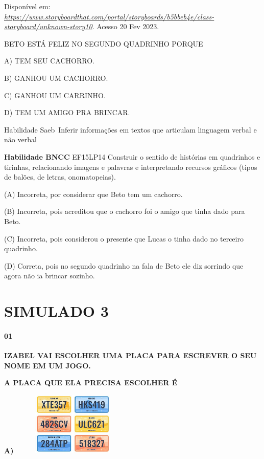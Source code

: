 \begin{escola}
Disponível em:
\href{https://www.storyboardthat.com/portal/storyboards/b5bbeb4e/class-storyboard/unknown-story10}{\emph{https://www.storyboardthat.com/portal/storyboards/b5bbeb4e/class-storyboard/unknown-story10}}.
Acesso 20 Fev 2023.

BETO ESTÁ FELIZ NO SEGUNDO QUADRINHO PORQUE

A) TEM SEU CACHORRO.

B) GANHOU UM CACHORRO.

C) GANHOU UM CARRINHO.

D) TEM UM AMIGO PRA BRINCAR.

Habilidade Saeb~Inferir informações em textos que articulam linguagem
verbal e não verbal

\textbf{Habilidade BNCC} EF15LP14 Construir o sentido de histórias em
quadrinhos e tirinhas, relacionando imagens e palavras e interpretando
recursos gráficos (tipos de balões, de letras, onomatopeias).

(A) Incorreta, por considerar que Beto tem um cachorro.

(B) Incorreta, pois acreditou que o cachorro foi o amigo que tinha dado
para Beto.

(C) Incorreta, pois considerou o presente que Lucas o tinha dado no
terceiro quadrinho.

(D) Correta, pois no segundo quadrinho na fala de Beto ele diz sorrindo
que agora não ia brincar sozinho.


\chapter{SIMULADO 3}

\subsubsection{01}\label{section-57}

\textbf{IZABEL VAI ESCOLHER UMA PLACA PARA ESCREVER O SEU NOME EM UM
JOGO.}

\textbf{A PLACA QUE ELA PRECISA ESCOLHER É }

\textbf{A)}
\includegraphics[width=2.32569in,height=1.18472in]{media/image222.jpg}


\end{escola}

